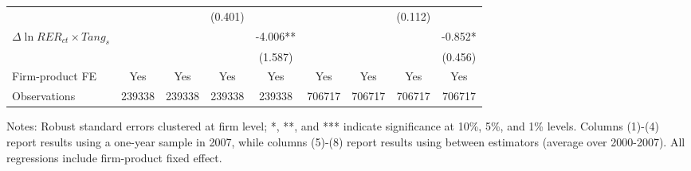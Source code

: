 \begin{table}
\begin{threeparttable}
\begin{tabular}{lcccccccc}
			&  &       & (0.401) &       &       &       & (0.112) &  \\
			$\Delta \ln RER_{ct} \times Tang_{s}$ &   &       &       & -4.006** &       &       &       & -0.852* \\
			&   &       &       & (1.587) &       &       &       & (0.456) \\
                \midrule
			Firm-product FE &  Yes   & Yes   & Yes   & Yes &Yes   & Yes   & Yes   & Yes\\
			Observations & 239338 & 239338 & 239338 & 239338 & 706717 & 706717 & 706717 & 706717 \\
			\bottomrule
		\end{tabular}
		\begin{tablenotes}
			\footnotesize
			\item Notes: Robust standard errors clustered at firm level; *, **, and *** indicate significance at 10\%, 5\%, and 1\% levels. Columns (1)-(4) report results using a one-year sample in 2007, while columns (5)-(8) report results using between estimators (average over 2000-2007). All regressions include firm-product fixed effect.
		\end{tablenotes}
	\end{threeparttable}
	\label{tab.robust.crosec}
\end{table}

